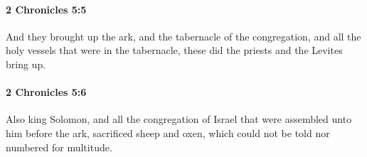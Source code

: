 		\paragraph{2 Chronicles 5:5} %
			\label{2CHRONICLES-5-5}

			And they brought up the ark, and the tabernacle of the congregation, and all the holy vessels that were in the tabernacle, these did the priests and the Levites bring up.


		\paragraph{2 Chronicles 5:6} %
			\label{2CHRONICLES-5-6}

			Also king Solomon, and all the congregation of Israel that were assembled unto him before the ark, sacrificed sheep and oxen, which could not be told nor numbered for multitude.


